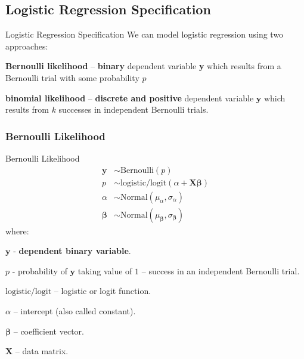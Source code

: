 \subsection{Logistic Regression Specification}
\begin{frame}{Logistic Regression Specification}
	We can model logistic regression using two approaches:
	\begin{vfilleditems}
		\item \textbf{Bernoulli likelihood} --
		\textbf{binary} dependent variable \textbf{y} which results from a
		Bernoulli trial with some probability $p$
		\item \textbf{binomial likelihood} --
		\textbf{discrete and positive} dependent variable $\textbf{y}$
		which results from $k$ successes in independent Bernoulli
		trials.
	\end{vfilleditems}
\end{frame}

\subsubsection{Bernoulli Likelihood}
\begin{frame}{Bernoulli Likelihood}
	\small
	$$
		\begin{aligned}
			\boldsymbol{y}     & \sim \text{Bernoulli}\left( p\right)                                      \\
			p                  & \sim \text{logistic/logit}(\alpha +  \mathbf{X} \boldsymbol{\beta})       \\
			\alpha             & \sim \text{Normal}(\mu_\alpha, \sigma_\alpha)                             \\
			\boldsymbol{\beta} & \sim \text{Normal}(\mu_{\boldsymbol{\beta}}, \sigma_{\boldsymbol{\beta}})
		\end{aligned}
	$$
	where:
	\begin{vfilleditems}
		\item \small $\boldsymbol{y}$ - \textbf{dependent binary variable}.
		\item \small $p$ - probability of $\boldsymbol{y}$ taking value of $1$ --
		success in an independent Bernoulli trial.
		\item \small $\text{logistic/logit}$ -- logistic or logit function.
		\item \small $\alpha$ -- intercept (also called constant).
		\item \small $\boldsymbol{\beta}$ -- coefficient vector.
		\item \small $\mathbf{X}$ -- data matrix.
	\end{vfilleditems}
\end{frame}

